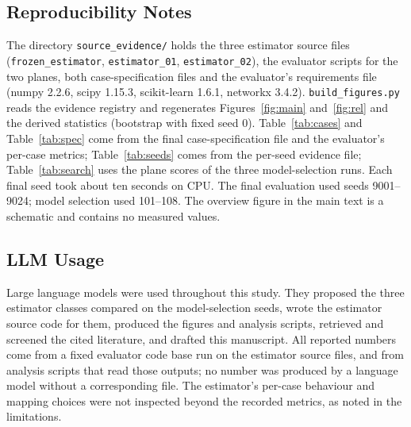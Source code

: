 \documentclass{article}
\begin{document}
\subsection{Reproducibility Notes}
The directory \texttt{source\_evidence/} holds the three estimator source files (\texttt{frozen\_estimator}, \texttt{estimator\_01}, \texttt{estimator\_02}), the evaluator scripts for the two planes, both case-specification files and the evaluator's requirements file (numpy 2.2.6, scipy 1.15.3, scikit-learn 1.6.1, networkx 3.4.2). \texttt{build\_figures.py} reads the evidence registry and regenerates Figures~\ref{fig:main} and~\ref{fig:rel} and the derived statistics (bootstrap with fixed seed 0). Table~\ref{tab:cases} and Table~\ref{tab:spec} come from the final case-specification file and the evaluator's per-case metrics; Table~\ref{tab:seeds} comes from the per-seed evidence file; Table~\ref{tab:search} uses the plane scores of the three model-selection runs. Each final seed took about ten seconds on CPU. The final evaluation used seeds 9001--9024; model selection used 101--108. The overview figure in the main text is a schematic and contains no measured values.

\subsection{LLM Usage}
Large language models were used throughout this study. They proposed the three estimator classes compared on the model-selection seeds, wrote the estimator source code for them, produced the figures and analysis scripts, retrieved and screened the cited literature, and drafted this manuscript. All reported numbers come from a fixed evaluator code base run on the estimator source files, and from analysis scripts that read those outputs; no number was produced by a language model without a corresponding file. The estimator's per-case behaviour and mapping choices were not inspected beyond the recorded metrics, as noted in the limitations.
\end{document}
